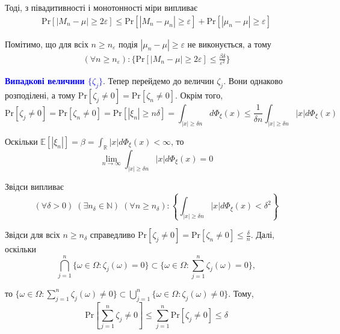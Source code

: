 \documentclass[14pt]{extarticle}
\newcommand{\<}{\langle}
\renewcommand{\>}{\rangle}
\theoremstyle{mystyle}{\newtheorem{definition}{Definition}[section]}
\theoremstyle{mystyle}{\newtheorem{proposition}[definition]{Proposition}}
\theoremstyle{mystyle}{\newtheorem{theorem}[definition]{Theorem}}
\theoremstyle{mystyle}{\newtheorem{lemma}[definition]{Lemma}}
\theoremstyle{mystyle}{\newtheorem{corollary}[definition]{Corollary}}
\theoremstyle{mystyle}{\newtheorem*{remark}{Remark}}
\theoremstyle{mystyle}{\newtheorem*{remarks}{Remarks}}
\theoremstyle{mystyle}{\newtheorem*{example}{Example}}
\theoremstyle{mystyle}{\newtheorem*{examples}{Examples}}
\theoremstyle{definition}{\newtheorem*{exercise}{Exercise}}
\theoremstyle{cstyle}{\newtheorem*{cthm}{}}
\theoremstyle{warn}
\begin{document}
Тоді, з півадитивності і монотонності міри випливає
\begin{gather}
    \text{Pr}[|M_n-\mu| \geq 2\varepsilon] \leq \text{Pr}[|M_n-\mu_n| \geq \varepsilon] + \text{Pr}[|\mu_n-\mu| \geq \varepsilon]
\end{gather}

Помітимо, що для всіх $n \geq n_{\varepsilon}$ подія $|\mu_n-\mu| \geq \varepsilon$ не виконується, а тому
\begin{gather}
    (\forall n \geq n_{\varepsilon}): \{\text{Pr}[|M_n-\mu| \geq 2\varepsilon] \leq \frac{\beta\delta}{\varepsilon^2}\}
\end{gather}

\textcolor{blue}{\textbf{Випадкові величини $\{\zeta_j\}$}}. Тепер перейдемо до величин $\zeta_j$. Вони однаково розподілені, а тому $\text{Pr}[\zeta_j \neq 0] = \text{Pr}[\zeta_n \neq 0]$. Окрім того,
\begin{equation}
    \text{Pr}[\zeta_j \neq 0] = \text{Pr}[\zeta_n \neq 0] = \text{Pr}[|\xi_n|\geq n\delta] = \int_{|x|\geq \delta n}d\Phi_{\xi}(x) \leq \frac{1}{\delta n}\int_{|x| \geq \delta n}|x|d\Phi_{\xi}(x)
\end{equation}

Оскільки $\mathbb{E}[|\xi_n|]=\beta = \int_{\mathbb{R}}|x|d\Phi_{\xi}(x) < \infty$, то
\begin{equation}
    \lim_{n \to \infty}\int_{|x| \geq \delta n}|x|d\Phi_{\xi}(x) = 0
\end{equation}

Звідси випливає
\begin{equation}
    (\forall \delta > 0) \; (\exists n_{\delta} \in \mathbb{N}) \; (\forall n \geq n_{\delta}): \left\{\int_{|x|\geq\delta n}|x|d\Phi_{\xi}(x) < \delta^2\right\}
\end{equation}

Звідси для всіх $n \geq n_{\delta}$ справедливо $\text{Pr}[\zeta_j \neq 0] = \text{Pr}[\zeta_n \neq 0] \leq \frac{\delta}{n}$. Далі, оскільки 
\begin{equation}
    \bigcap_{j=1}^n \{\omega \in \Omega: \zeta_j(\omega) = 0\} \subset \{\omega \in \Omega: \sum_{j=1}^n \zeta_j(\omega)=0\},
\end{equation}

то $\{\omega \in \Omega: \sum_{j=1}^n \zeta_j(\omega) \neq 0\} \subset \bigcup_{j=1}^n\{\omega \in \Omega: \zeta_j(\omega) \neq 0\}$. Тому,
\begin{equation}
    \text{Pr}\left[\sum_{j=1}^n \zeta_j \neq 0\right] \leq \sum_{j=1}^n \text{Pr}[\zeta_j \neq 0] \leq \delta
\end{equation}
\end{document}

